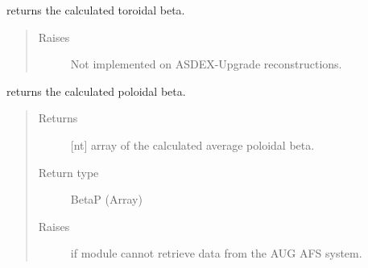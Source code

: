 \documentclass[letterpaper,10pt,english]{sphinxmanual}
\begin{document}
\begin{fulllineitems}
\begin{fulllineitems}
\begin{quote}
\begin{description}
\end{description}\end{quote}

\end{fulllineitems}


\begin{fulllineitems}
\label{\detokenize{eqtools:eqtools.AUGData.AUGDDData.getBetaT}}
returns the calculated toroidal beta.
\begin{quote}\begin{description}
\item[{Raises}] \leavevmode
{} \textendash{} Not implemented on ASDEX-Upgrade reconstructions.

\end{description}\end{quote}

\end{fulllineitems}


\begin{fulllineitems}
\label{\detokenize{eqtools:eqtools.AUGData.AUGDDData.getBetaP}}
returns the calculated poloidal beta.
\begin{quote}\begin{description}
\item[{Returns}] \leavevmode
{[}nt{]} array of the calculated average poloidal beta.

\item[{Return type}] \leavevmode
BetaP (Array)

\item[{Raises}] \leavevmode
{} \textendash{} if module cannot retrieve data from the AUG AFS system.

\end{description}\end{quote}

\end{fulllineitems}



\end{fulllineitems}
\end{document}
